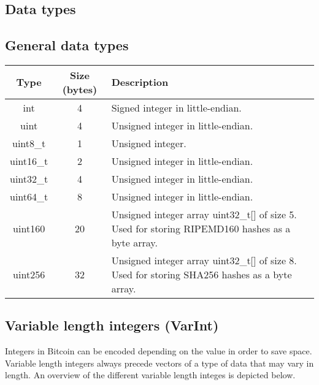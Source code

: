 \begin{appendices}

\section{Data types} \label{sec:DataTypes}

\subsection*{General data types}

\vspace{4pt}
\begin{center}
	\begin{tabularx}{\textwidth}{| c | c | X |}
		\hline
		\textbf{Type} & \textbf{Size (bytes)} & \textbf{Description} \\ \hline \hline
		int & 4 & Signed integer in little-endian. \\ \hline
		uint & 4 & Unsigned integer in little-endian. \\ \hline
		uint8\_t & 1 & Unsigned integer. \\ \hline
		uint16\_t & 2 & Unsigned integer in little-endian. \\ \hline
		uint32\_t & 4 & Unsigned integer in little-endian. \\ \hline
		uint64\_t & 8 & Unsigned integer in little-endian. \\ \hline
		uint160 & 20 & Unsigned integer array uint32\_t[] of size 5. \newline Used for storing RIPEMD160 hashes as a byte array.\\ \hline
		uint256 & 32 & Unsigned integer array uint32\_t[] of size 8. \newline Used for storing SHA256 hashes as a byte array.\\ \hline
	\end{tabularx}
\end{center}
\vspace{10pt}

\subsection*{Variable length integers (VarInt)}
Integers in Bitcoin can be encoded depending on the value in order to save space. Variable length integers always precede vectors of a type of data that may vary in length. An overview of the different variable length integes is depicted below.


\end{appendices}

